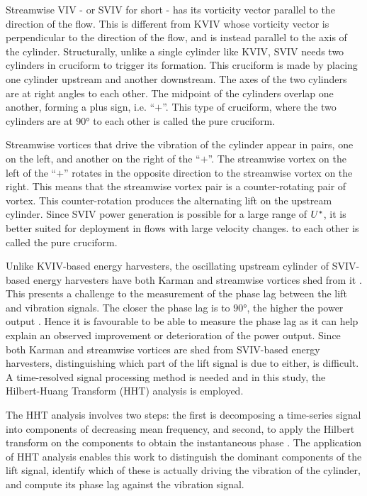 \documentclass[oneside]{utmthesis}
\begin{document}
Streamwise VIV - or SVIV for short - has its vorticity vector parallel to the direction of the flow. This is different from KVIV whose vorticity vector is perpendicular to the direction of the flow, and is instead parallel to the axis of the cylinder. Structurally, unlike a single cylinder like KVIV, SVIV needs two cylinders in cruciform to trigger its formation. This cruciform is made by placing one cylinder upstream and another downstream. The axes of the two cylinders are at right angles to each other. The midpoint of the cylinders overlap one another, forming a plus sign, i.e. ``$+$''. This type of cruciform, where the two cylinders are at $90 \si{\degree}$ to each other is called the pure cruciform.

Streamwise vortices that drive the vibration of the cylinder appear in pairs, one on the left, and another on the right of the ``$+$''. The streamwise vortex on the left of the ``$+$'' rotates in the opposite direction to the streamwise vortex on the right. This means that the streamwise vortex pair is a counter-rotating pair of vortex. This counter-rotation produces the alternating lift on the upstream cylinder. Since SVIV power generation is possible for a large range of $U^{*}$, it is better suited for deployment in flows with large velocity changes. to each other is called the pure cruciform.

Unlike KVIV-based energy harvesters, the oscillating upstream cylinder of SVIV-based energy harvesters have both Karman and streamwise vortices shed from it \citep{Koide2017}. This presents a challenge to the measurement of the phase lag between the lift and vibration signals. The closer the phase lag is to $90 \si{\degree}$, the higher the power output \citep{Koide2013,Raghavan2007a}. Hence it is favourable to be able to measure the phase lag as it can help explain an observed improvement or deterioration of the power output. Since both Karman and streamwise vortices are shed from SVIV-based energy harvesters, distinguishing which part of the lift signal is due to either, is difficult. A time-resolved signal processing method is needed and in this study, the Hilbert-Huang Transform (HHT) analysis is employed.

The HHT analysis involves two steps: the first is decomposing a time-series signal into components of decreasing mean frequency, and second, to apply the Hilbert transform on the components to obtain the instantaneous phase \citep{Souza2022}. The application of HHT analysis enables this work to distinguish the dominant components of the lift signal, identify which of these is actually driving the vibration of the cylinder, and compute its phase lag against the vibration signal.
\end{document}
